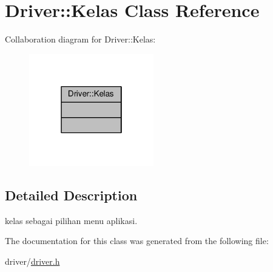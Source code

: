 \hypertarget{classDriver_1_1Kelas}{}\section{Driver\+:\+:Kelas Class Reference}
\label{classDriver_1_1Kelas}


Collaboration diagram for Driver\+:\+:Kelas\+:
\nopagebreak
\begin{figure}[H]
\begin{center}
\leavevmode
\includegraphics[width=154pt]{classDriver_1_1Kelas__coll__graph}
\end{center}
\end{figure}


\subsection{Detailed Description}
kelas sebagai pilihan menu aplikasi. 

The documentation for this class was generated from the following file\+:\begin{DoxyCompactItemize}
\item 
driver/\hyperlink{driver_8h}{driver.\+h}\end{DoxyCompactItemize}

